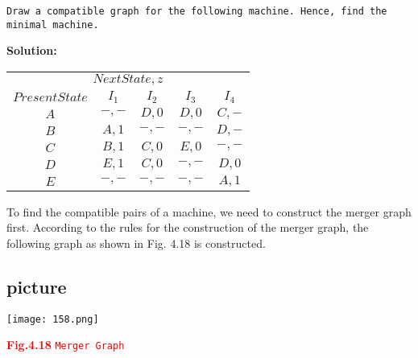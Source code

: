 \documentclass[9pt]{beamer}
\begin{document}
\begin{frame}
 \hspace*{0.1cm} \texttt{Draw a compatible graph for the following machine. Hence, find the minimal machine.}

\vspace*{0.2cm}
\large{\textbf{Solution:}}

\vspace*{0.1cm}
\pause
\begin{center}
\begin{tabular}{ccccc}
 \hline

 \hline

 \hline

 \hline

\multicolumn{5}{c}{$Next State, z$}\\
 \cline{2-5}
       $Present State$   &    $I_1$      &    $I_2$        &        $I_3$   &     $I_4$      \\
 \hline
       $A$         &    $-,-$    &     $D, 0$    &     $D, 0$   &   $C, -$     \\
       $B$         &    $A, 1$   &     $-, -$    &     $-, -$   &   $D, -$     \\
       $C$         &    $B, 1$   &     $C, 0$    &     $E, 0$   &   $-, -$     \\
       $D$         &    $E, 1$   &     $C, 0$    &     $-, -$   &   $D, 0$     \\
       $E$         &    $-, -$   &     $-, -$    &     $-, -$   &   $A, 1$     \\
 \hline

 \hline

 \hline

 \hline
\end{tabular}
\end{center}
\end{frame}

\begin{frame}
\hspace*{0.2cm} To find the compatible pairs of a machine, we need to construct the merger graph first. According
to the rules for the construction of the merger graph, the following graph as shown in Fig. 4.18 is constructed.

\pause
\begin{center}
  \section{picture}
\texttt{[image: 158.png]}
\end{center}
\textcolor{red}{\centerline{\textbf{Fig.4.18} \hspace*{0.5cm} \texttt{Merger Graph}}}
\end{frame}
\end{document}
